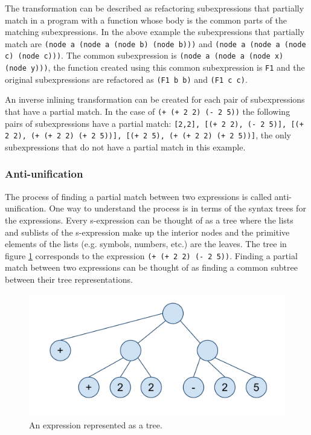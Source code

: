 \documentclass[a4paper,10pt]{article}
\begin{document}
  The transformation can be described as refactoring subexpressions that partially match in a program with a function whose body is the common parts of the matching subexpressions.  In the above example the subexpressions that partially match are \texttt{(node a (node a (node b) (node b)))} and \texttt{(node a (node a (node c) (node c)))}.  The common subexpression is \texttt{(node a (node a (node x) (node y)))}, the function created using this common subexpression is \texttt{F1} and the original subexpressions are refactored as \texttt{(F1 b b)} and \texttt{(F1 c c)}.

An inverse inlining transformation can be created for each pair of subexpressions that have a partial match.  In the case of \texttt{(+ (+ 2 2) (- 2 5))} the following pairs of subexpressions have a partial match: \texttt{[2,2], [(+ 2 2), (- 2 5)], [(+ 2 2), (+ (+ 2 2) (+ 2 5))], [(+ 2 5), (+ (+ 2 2) (+ 2 5))]}, the only subexpressions that do not have a partial match in this example.
\subsubsection{Anti-unification}
The process of finding a partial match between two expressions is called anti-unification.  One way to understand the process is in terms of the syntax trees for the expressions.  Every s-expression can be thought of as a tree where the lists and sublists of the s-expression make up the interior nodes and the primitive elements of the lists (e.g. symbols, numbers, etc.) are the leaves.  The tree in figure \ref{expressionTree} corresponds to the expression \texttt{(+ (+ 2 2) (- 2 5))}.  Finding a partial match between two expressions can be thought of as finding a common subtree between their tree representations.
\begin{figure}[h]
\begin{center}
\includegraphics[scale=.40]{expressionTree.pdf}
\caption{An expression represented as a tree.}
\label{expressionTree}
\end{center}
\end{figure}
\end{document}
